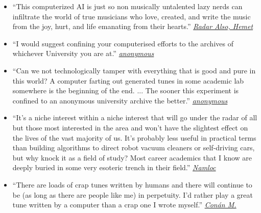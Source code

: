 \documentclass[a4paper,notitlepage,twoside]{book}
\begin{document}
\begin{itemize}
\item ``This computerized AI is just so non musically untalented lazy nerds can infiltrate the world of true musicians who love, created, and write the music from the joy, hurt, and life emanating from their hearts.'' \href{https://www.dailymail.co.uk/sciencetech/article-4544400/Researchers-create-computer-writes-folk-music.html#comments}{{\em Radar Also, Hemet}}
\item ``I would suggest confining your computerised efforts to the archives of whichever University you are at.'' \href{https://thesession.org/discussions/39604}{{\em anonymous}}
\item ``Can we not technologically tamper with everything that is good and pure in this world? A computer farting out generated tunes in some academic lab somewhere is the beginning of the end. ... The sooner this experiment is confined to an anonymous university archive the better.'' \href{https://thesession.org/discussions/40416}{{\em anonymous}}
\item ``It’s a niche interest within a niche interest that will go under the radar of all but those most interested in the area and won’t have the slightest effect on the lives of the vast majority of us. It’s probably less useful in practical terms than building algorithms to direct robot vacuum cleaners or self-driving cars, but why knock it as a field of study? Most career academics that I know are deeply buried in some very esoteric trench in their field.'' \href{https://thesession.org/discussions/39604}{{\em Namloc}}
\item ``There are loads of crap tunes written by humans and there will continue to be (as long as there are people like me) in perpetuity. I’d rather play a great tune written by a computer than a crap one I wrote myself.'' \href{https://thesession.org/discussions/39604}{{\em Conán M.}}

\end{itemize}
\end{document}
